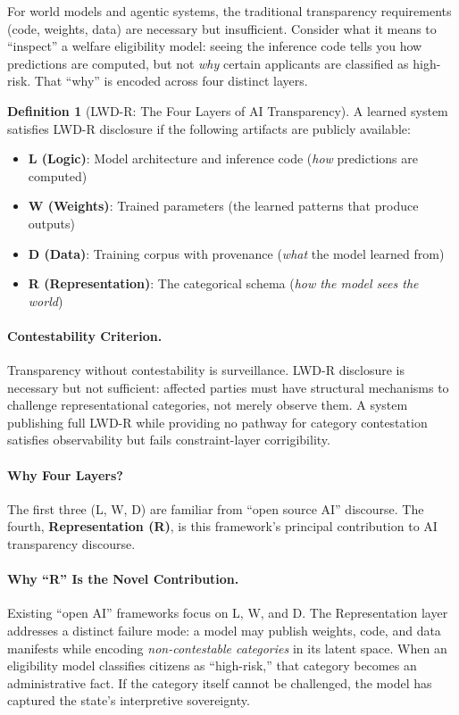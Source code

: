 \documentclass[11pt,a4paper]{article}
\theoremstyle{definition}
\newtheorem{definition}{Definition}[section]
\begin{document}
For world models and agentic systems, the traditional transparency requirements (code, weights, data) are necessary but insufficient. Consider what it means to ``inspect'' a welfare eligibility model: seeing the inference code tells you how predictions are computed, but not \textit{why} certain applicants are classified as high-risk. That ``why'' is encoded across four distinct layers.

\begin{definition}[LWD-R: The Four Layers of AI Transparency]
\label{def:lwdr}
A learned system satisfies LWD-R disclosure if the following artifacts are publicly available:
\begin{itemize}[noitemsep]
    \item \textbf{L (Logic)}: Model architecture and inference code (\textit{how} predictions are computed)
    \item \textbf{W (Weights)}: Trained parameters (the learned patterns that produce outputs)
    \item \textbf{D (Data)}: Training corpus with provenance (\textit{what} the model learned from)
    \item \textbf{R (Representation)}: The categorical schema (\textit{how the model sees the world})
\end{itemize}
\end{definition}

\paragraph{Contestability Criterion.} Transparency without contestability is surveillance. LWD-R disclosure is necessary but not sufficient: affected parties must have structural mechanisms to challenge representational categories, not merely observe them. A system publishing full LWD-R while providing no pathway for category contestation satisfies observability but fails constraint-layer corrigibility.

\paragraph{Why Four Layers?} The first three (L, W, D) are familiar from ``open source AI'' discourse. The fourth, \textbf{Representation (R)}, is this framework's principal contribution to AI transparency discourse.

\paragraph{Why ``R'' Is the Novel Contribution.} Existing ``open AI'' frameworks focus on L, W, and D. The Representation layer addresses a distinct failure mode: a model may publish weights, code, and data manifests while encoding \textit{non-contestable categories} in its latent space. When an eligibility model classifies citizens as ``high-risk,'' that category becomes an administrative fact. If the category itself cannot be challenged, the model has captured the state's interpretive sovereignty.
\end{document}
